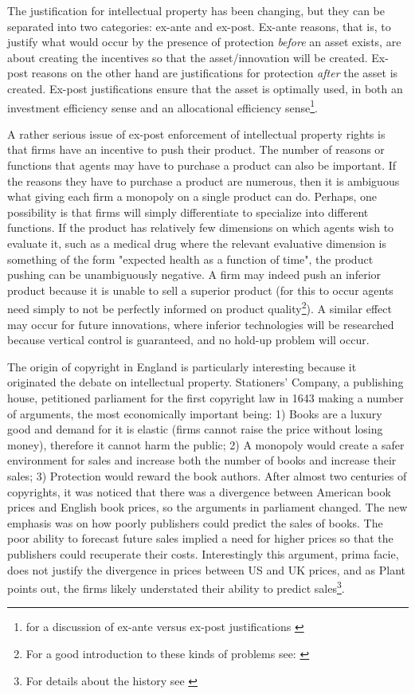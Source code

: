 
The justification for intellectual property has been changing, but they can be separated into two categories: ex-ante and ex-post. Ex-ante reasons, that is, to justify what would occur by the presence of protection \textit{before} an asset exists, are about creating the incentives so that the asset/innovation will be created. Ex-post reasons on the other hand are justifications for protection \textit{after} the asset is created. Ex-post justifications ensure that the asset is optimally used, in both an investment efficiency sense and an allocational efficiency sense\footnote{for a discussion of ex-ante versus ex-post justifications \cite{Lemleyt2004}}.

A rather serious issue of ex-post enforcement of intellectual property rights is that firms have an incentive to push their product. The number of reasons or functions that agents may have to purchase a product can also be important. If the reasons they have to purchase a product are numerous, then it is ambiguous what giving each firm a monopoly on a single product can do. Perhaps, one possibility is that firms will simply differentiate to specialize into different functions. If the product has relatively few dimensions on which agents wish to evaluate it, such as a medical drug where the relevant evaluative dimension is something of the form "expected health as a function of time", the product pushing can be unambiguously negative. A firm may indeed push an inferior product because it is unable to sell a superior product (for this to occur agents need simply to not be perfectly informed on product quality\footnote{For a good introduction to these kinds of problems see: \cite{spiegler2011bounded} }). A similar effect may occur for future innovations, where inferior technologies will be researched because vertical control is guaranteed, and no hold-up problem will occur.

The origin of copyright in England is particularly interesting because it originated the debate on intellectual property. Stationers' Company, a publishing house, petitioned parliament for the first copyright law in 1643 making a number of arguments, the most economically important being: 1) Books are a luxury good and demand for it is elastic (firms cannot raise the price without losing money), therefore it cannot harm the public; 2) A monopoly would create a safer environment for sales and increase both the number of books and increase their sales; 3) Protection would reward the book authors. After almost two centuries of copyrights, it was noticed that there was a divergence between American book prices and English book prices, so the arguments in parliament changed. The new emphasis was on how poorly publishers could predict the sales of books. The poor ability to forecast future sales implied a need for higher prices so that the publishers could recuperate their costs. Interestingly this argument, prima facie, does  not justify the divergence in prices between US and UK prices, and as Plant points out, the firms likely understated their ability to predict sales\footnote{For details about the history see \cite{Plant1934}}.

